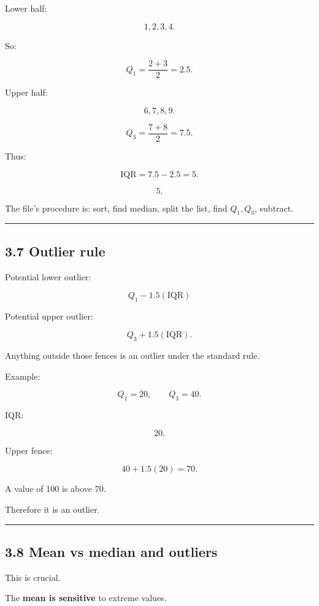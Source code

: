 \documentclass[
]{article}
\begin{document}
Lower half:

\[
1,2,3,4.
\]

So:

\[
Q_1=\frac{2+3}{2}=2.5.
\]

Upper half:

\[
6,7,8,9.
\]

\[
Q_3=\frac{7+8}{2}=7.5.
\]

Thus:

\[
\text{IQR}=7.5-2.5=5.
\]

\[
\boxed5.
\]

The file's procedure is: sort, find median, split the list, find
\(Q_1,Q_3\), subtract.

\begin{center}\rule{0.5\linewidth}{0.5pt}\end{center}

\subsection{3.7 Outlier rule}\label{outlier-rule}

Potential lower outlier:

\[
\boxed{Q_1-1.5(\text{IQR})}
\]

Potential upper outlier:

\[
\boxed{Q_3+1.5(\text{IQR})}.
\]

Anything outside those fences is an outlier under the standard rule.

Example:

\[
Q_1=20,\qquad Q_3=40.
\]

IQR:

\[
20.
\]

Upper fence:

\[
40+1.5(20)
=
70.
\]

A value of 100 is above 70.

Therefore it is an outlier.

\begin{center}\rule{0.5\linewidth}{0.5pt}\end{center}

\subsection{3.8 Mean vs median and
outliers}\label{mean-vs-median-and-outliers}

This is crucial.

The \textbf{mean is sensitive} to extreme values.
\end{document}
